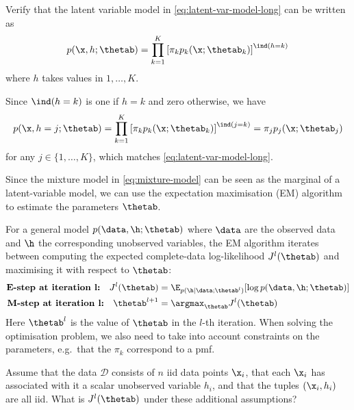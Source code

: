 \begin{exenumerate}
\item Verify that the latent variable model in \eqref{eq:latent-var-model-long} can be written as
  \begin{equation}
    p(\x, h; \thetab) = \prod_{k=1}^K \left[  \pi_k  p_k(\x; \thetab_k) \right]^{\ind(h=k)}
    \label{eq:latent-var-model}
  \end{equation}
  where $h$ takes values in $1, \ldots, K$.
  
  \begin{solution}
    Since $\ind(h=k)$ is one if $h=k$ and zero otherwise, we have
    \begin{equation}
      p(\x, h=j; \thetab) =  \prod_{k=1}^K \left[  \pi_k  p_k(\x; \thetab_k) \right]^{\ind(j=k)} = \pi_j p_j(\x ; \thetab_j)
    \end{equation}
    for any $j \in \{1, \ldots, K\}$, which matches
    \eqref{eq:latent-var-model-long}.
  \end{solution}

\item Since the mixture model in \eqref{eq:mixture-model} can be seen as the
  marginal of a latent-variable model, we can use the expectation maximisation
  (EM) algorithm to estimate the parameters $\thetab$.

  For a general model $p(\data,\h; \thetab)$ where $\data$ are the observed data
  and $\h$ the corresponding unobserved variables, the EM algorithm iterates between
  computing the expected complete-data log-likelihood $J^l(\thetab)$ and maximising
  it with respect to $\thetab$: 
  \begin{align}
    \textbf{E-step at iteration l:}\quad J^l(\thetab) &= \E_{p(\h | \data; \thetab^l)} [ \log p(\data,\h; \thetab)]\\
    \textbf{M-step at iteration l:}\quad \thetab^{l+1} &= \argmax_{\thetab} J^l(\thetab) 
  \end{align}
  Here $\thetab^l$ is the value of $\thetab$ in the $l$-th iteration. When
  solving the optimisation problem, we also need to take into account
  constraints on the parameters, e.g.\ that the $\pi_k$ correspond to a pmf.
  
  Assume that the data $\mathcal{D}$ consists of $n$ iid data points $\x_i$,
  that each $\x_i$ has associated with it a scalar unobserved variable $h_i$,
  and that the tuples $(\x_i, h_i)$ are all iid. What is $J^l(\thetab)$ under
  these additional assumptions?
  

\end{exenumerate}
